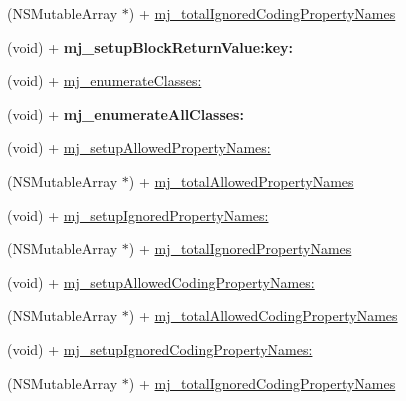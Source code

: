 \begin{DoxyCompactItemize}
\item 
(N\+S\+Mutable\+Array $\ast$) + \mbox{\hyperlink{category_n_s_object_07_m_j_class_08_a47303fda56f3bc30563926134039a4c1}{mj\+\_\+total\+Ignored\+Coding\+Property\+Names}}
\item 
\mbox{\label{category_n_s_object_07_m_j_class_08_ac74117e76c2056b27d4db3fa704667f3}} 
(void) + {\bfseries mj\+\_\+setup\+Block\+Return\+Value\+:key\+:}
\item 
(void) + \mbox{\hyperlink{category_n_s_object_07_m_j_class_08_a3f9ef2567bf4f59be9a67cba74dc2cac}{mj\+\_\+enumerate\+Classes\+:}}
\item 
\mbox{\label{category_n_s_object_07_m_j_class_08_a7247385f9e6d741b88bf2b1d93da9896}} 
(void) + {\bfseries mj\+\_\+enumerate\+All\+Classes\+:}
\item 
(void) + \mbox{\hyperlink{category_n_s_object_07_m_j_class_08_a8a14f8d0e4307834475f58536240810f}{mj\+\_\+setup\+Allowed\+Property\+Names\+:}}
\item 
(N\+S\+Mutable\+Array $\ast$) + \mbox{\hyperlink{category_n_s_object_07_m_j_class_08_a3a21a15ef7f5f746a92acc1c1ebcd739}{mj\+\_\+total\+Allowed\+Property\+Names}}
\item 
(void) + \mbox{\hyperlink{category_n_s_object_07_m_j_class_08_afd37a503c0b0d605038315aef0d3ef33}{mj\+\_\+setup\+Ignored\+Property\+Names\+:}}
\item 
(N\+S\+Mutable\+Array $\ast$) + \mbox{\hyperlink{category_n_s_object_07_m_j_class_08_a62bed31696e6d0dd4b3ed5460eaf123e}{mj\+\_\+total\+Ignored\+Property\+Names}}
\item 
(void) + \mbox{\hyperlink{category_n_s_object_07_m_j_class_08_a8b463753f75f643f380cfe86d7223b2d}{mj\+\_\+setup\+Allowed\+Coding\+Property\+Names\+:}}
\item 
(N\+S\+Mutable\+Array $\ast$) + \mbox{\hyperlink{category_n_s_object_07_m_j_class_08_ab44bc8c5c15e061e75ac2a68de745e1a}{mj\+\_\+total\+Allowed\+Coding\+Property\+Names}}
\item 
(void) + \mbox{\hyperlink{category_n_s_object_07_m_j_class_08_ad89c658e8ab42bcba921a1c6e921c1cd}{mj\+\_\+setup\+Ignored\+Coding\+Property\+Names\+:}}
\item 
(N\+S\+Mutable\+Array $\ast$) + \mbox{\hyperlink{category_n_s_object_07_m_j_class_08_a47303fda56f3bc30563926134039a4c1}{mj\+\_\+total\+Ignored\+Coding\+Property\+Names}}
\item 

\end{DoxyCompactItemize}
